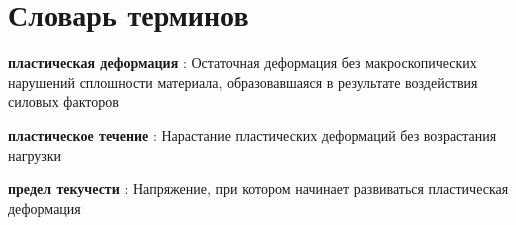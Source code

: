 \chapter*{Словарь терминов}             %

\textbf{пластическая деформация} : Остаточная деформация без макроскопических нарушений сплошности материала, образовавшаяся в результате воздействия силовых факторов

\textbf{пластическое течение} : Нарастание пластических деформаций без возрастания нагрузки

\textbf{предел текучести} : Напряжение, при котором начинает развиваться пластическая деформация

